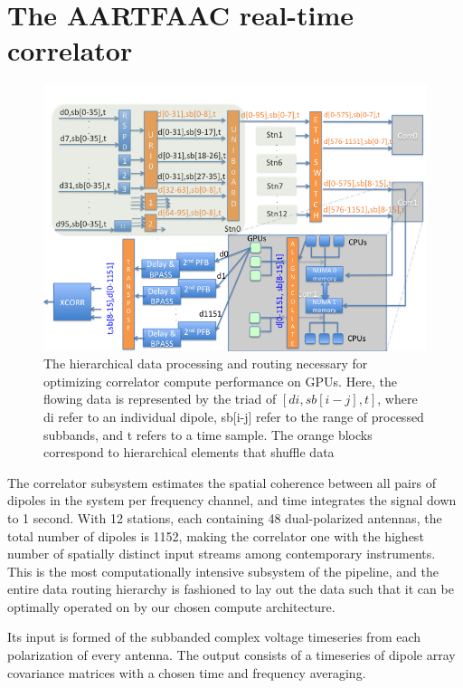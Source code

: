 \documentclass{ws-jai}
\begin{document}
\section {\label{sec:gpucorr} The AARTFAAC real-time correlator}
\begin{figure}[htbp]
\centering
\includegraphics[width=1\textwidth]{Figs/data_routing_transform_hierarchy/Slide1.png}
\caption{The hierarchical  data processing and routing  necessary for optimizing
  correlator  compute  performance   on  GPUs.  Here,  the   flowing  data  is
  represented by the triad of $[di,sb[i-j],t]$, where di refer to an individual
  dipole, sb[i-j] refer  to the range of  processed subbands, and t  refers to a
  time  sample.  The orange  blocks  correspond  to hierarchical  elements  that
  shuffle data }
\label{fig:afaac_station_hw}
\end{figure}

The correlator  subsystem estimates the  spatial coherence between all  pairs of
dipoles in the system per frequency channel, and time integrates the signal down
to 1 second.  With 12 stations, each containing 48  dual-polarized antennas, the
total number  of dipoles  is 1152,  making the correlator  one with  the highest
number of spatially distinct input streams among contemporary instruments.  This
is the most computationally intensive subsystem  of the pipeline, and the entire
data routing  hierarchy is fashioned  to lay  out the data  such that it  can be
optimally operated on by our chosen compute architecture.

Its  input is  formed  of the  subbanded complex  voltage  timeseries from  each
polarization of  every antenna.  The output  consists of a timeseries  of dipole
array covariance matrices with a chosen time and frequency averaging.
\end{document}
